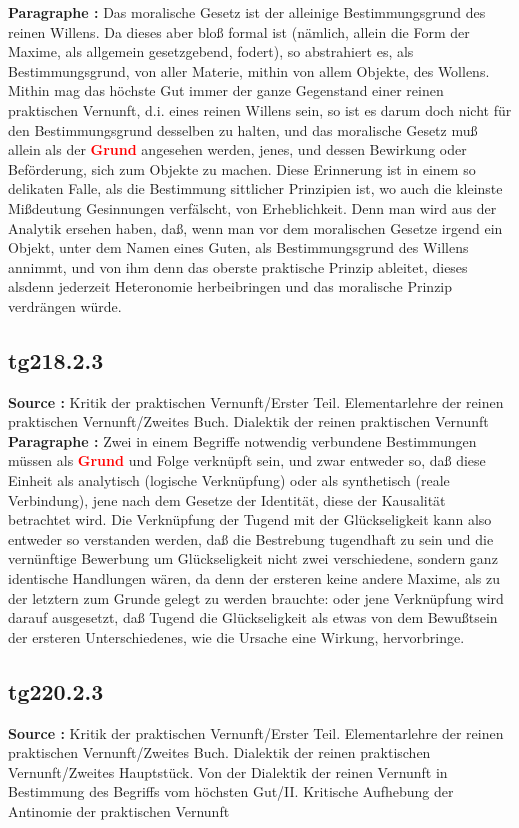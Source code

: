 \documentclass[a4paper,12pt,twoside]{book}
\newcommand{\match}[1]{\textcolor{red}{\textbf{#1}}}
\begin{document}
	\noindent\textbf{Paragraphe : }Das moralische Gesetz ist der alleinige Bestimmungsgrund des reinen Willens. Da dieses aber bloß formal ist (nämlich, allein die Form der Maxime, als allgemein gesetzgebend, fodert), so abstrahiert es, als Bestimmungsgrund, von aller Materie, mithin von allem Objekte, des Wollens. Mithin mag das höchste Gut immer der ganze Gegenstand einer reinen praktischen Vernunft, d.i. eines reinen Willens sein, so ist es darum doch nicht für den Bestimmungsgrund desselben zu halten, und das moralische Gesetz muß allein als der \match{Grund} angesehen werden, jenes, und dessen Bewirkung oder Beförderung, sich zum Objekte zu machen. Diese Erinnerung ist in einem so delikaten Falle, als die Bestimmung sittlicher Prinzipien ist, wo auch die kleinste Mißdeutung Gesinnungen verfälscht, von Erheblichkeit. Denn man wird aus der Analytik ersehen haben, daß, wenn man vor dem moralischen Gesetze irgend ein Objekt, unter dem Namen eines Guten, als Bestimmungsgrund des Willens annimmt, und von ihm denn das oberste praktische Prinzip ableitet, dieses alsdenn jederzeit Heteronomie herbeibringen und das moralische Prinzip verdrängen würde. 
	
	\subsection*{tg218.2.3} 
	\textbf{Source : }Kritik der praktischen Vernunft/Erster Teil. Elementarlehre der reinen praktischen Vernunft/Zweites Buch. Dialektik der reinen praktischen Vernunft\\  
	
	\noindent\textbf{Paragraphe : }Zwei in einem Begriffe notwendig verbundene Bestimmungen müssen als \match{Grund} und Folge verknüpft sein, und zwar entweder so, daß diese Einheit als analytisch (logische Verknüpfung) oder als synthetisch (reale Verbindung), jene nach dem Gesetze der Identität, diese der Kausalität betrachtet wird. Die Verknüpfung der Tugend mit der Glückseligkeit kann also entweder so verstanden werden, daß die Bestrebung tugendhaft zu sein und die vernünftige Bewerbung um Glückseligkeit nicht zwei verschiedene, sondern ganz identische Handlungen wären, da denn der ersteren keine andere Maxime, als zu der letztern zum Grunde gelegt zu werden brauchte: oder jene Verknüpfung wird darauf ausgesetzt, daß Tugend die Glückseligkeit als etwas von dem Bewußtsein der ersteren Unterschiedenes, wie die Ursache eine Wirkung, hervorbringe. 
	
	\subsection*{tg220.2.3} 
	\textbf{Source : }Kritik der praktischen Vernunft/Erster Teil. Elementarlehre der reinen praktischen Vernunft/Zweites Buch. Dialektik der reinen praktischen Vernunft/Zweites Hauptstück. Von der Dialektik der reinen Vernunft in Bestimmung des Begriffs vom höchsten Gut/II. Kritische Aufhebung der Antinomie der praktischen Vernunft\\  
	
\end{document}
